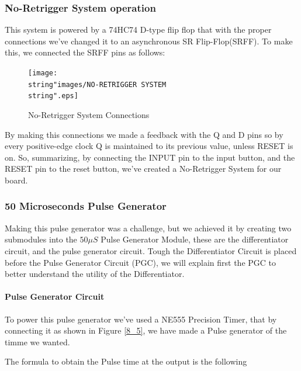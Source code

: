 \subsubsection{No-Retrigger System operation}

This system is powered by a 74HC74 D-type flip flop that with the
proper connections we've changed it to an asynchronous SR Flip-Flop(SRFF).
To make this, we connected the SRFF pins as follows:

\begin{figure}[H]
\begin{centering}
\texttt{[image: \\string"images/NO-RETRIGGER SYSTEM\\string".eps]}
\par\end{centering}
\caption{No-Retrigger System Connections}

\end{figure}

By making this connections we made a feedback with the Q and D pins
so by every positive-edge clock Q is maintained to its previous value,
unless RESET is on. So, summarizing, by connecting the INPUT pin to
the input button, and the RESET pin to the reset button, we've created
a No-Retrigger System for our board.

\subsubsection{50 Microseconds Pulse Generator}

Making this pulse generator was a challenge, but we achieved it by
creating two submodules into the $50\mu S$ Pulse Generator Module,
these are the differentiator circuit, and the pulse generator circuit.
Tough the Differentiator Circuit is placed before the Pulse Generator
Circuit (PGC), we will explain first the PGC to better understand
the utility of the Differentiator.

\paragraph{Pulse Generator Circuit}

To power this pulse generator we've used a NE555 Precision Timer,
that by connecting it as shown in Figure \ref{8_5}, we have made
a Pulse generator of the timme we wanted.

The formula to obtain the Pulse time at the output is the following

